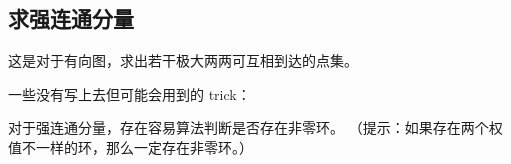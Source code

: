 \subsection{求强连通分量}

这是对于有向图，求出若干极大两两可互相到达的点集。

一些没有写上去但可能会用到的 trick：

对于强连通分量，存在容易算法判断是否存在非零环。
（提示：如果存在两个权值不一样的环，那么一定存在非零环。）



